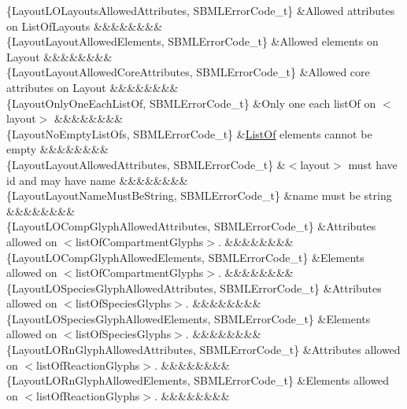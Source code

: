\begin{DoxyParagraph}{}
\begin{longtabu}
\{Layout\+L\+O\+Layouts\+Allowed\+Attributes, S\+B\+M\+L\+Error\+Code\+\_\+t\} &Allowed attributes on List\+Of\+Layouts &&&&&&&&\\
\{Layout\+Layout\+Allowed\+Elements, S\+B\+M\+L\+Error\+Code\+\_\+t\} &Allowed elements on Layout &&&&&&&&\\
\{Layout\+Layout\+Allowed\+Core\+Attributes, S\+B\+M\+L\+Error\+Code\+\_\+t\} &Allowed core attributes on Layout &&&&&&&&\\
\{Layout\+Only\+One\+Each\+List\+Of, S\+B\+M\+L\+Error\+Code\+\_\+t\} &Only one each list\+Of on {\ttfamily $<$layout$>$} &&&&&&&&\\
\{Layout\+No\+Empty\+List\+Ofs, S\+B\+M\+L\+Error\+Code\+\_\+t\} &\hyperlink{class_list_of}{List\+Of} elements cannot be empty &&&&&&&&\\
\{Layout\+Layout\+Allowed\+Attributes, S\+B\+M\+L\+Error\+Code\+\_\+t\} &{\ttfamily $<$layout$>$} must have \textquotesingle{}id\textquotesingle{} and may have \textquotesingle{}name\textquotesingle{} &&&&&&&&\\
\{Layout\+Layout\+Name\+Must\+Be\+String, S\+B\+M\+L\+Error\+Code\+\_\+t\} &\textquotesingle{}name\textquotesingle{} must be string &&&&&&&&\\
\{Layout\+L\+O\+Comp\+Glyph\+Allowed\+Attributes, S\+B\+M\+L\+Error\+Code\+\_\+t\} &Attributes allowed on {\ttfamily $<$list\+Of\+Compartment\+Glyphs$>$}. &&&&&&&&\\
\{Layout\+L\+O\+Comp\+Glyph\+Allowed\+Elements, S\+B\+M\+L\+Error\+Code\+\_\+t\} &Elements allowed on {\ttfamily $<$list\+Of\+Compartment\+Glyphs$>$}. &&&&&&&&\\
\{Layout\+L\+O\+Species\+Glyph\+Allowed\+Attributes, S\+B\+M\+L\+Error\+Code\+\_\+t\} &Attributes allowed on {\ttfamily $<$list\+Of\+Species\+Glyphs$>$}. &&&&&&&&\\
\{Layout\+L\+O\+Species\+Glyph\+Allowed\+Elements, S\+B\+M\+L\+Error\+Code\+\_\+t\} &Elements allowed on {\ttfamily $<$list\+Of\+Species\+Glyphs$>$}. &&&&&&&&\\
\{Layout\+L\+O\+Rn\+Glyph\+Allowed\+Attributes, S\+B\+M\+L\+Error\+Code\+\_\+t\} &Attributes allowed on {\ttfamily $<$list\+Of\+Reaction\+Glyphs$>$}. &&&&&&&&\\
\{Layout\+L\+O\+Rn\+Glyph\+Allowed\+Elements, S\+B\+M\+L\+Error\+Code\+\_\+t\} &Elements allowed on {\ttfamily $<$list\+Of\+Reaction\+Glyphs$>$}. &&&&&&&&\\

\end{longtabu}
\end{DoxyParagraph}
